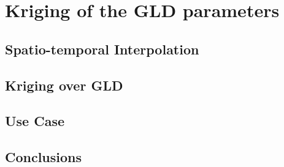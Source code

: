 \chapter{Kriging of the GLD parameters}\label{cap:kriging}

\section{Spatio-temporal Interpolation}

\section{Kriging over GLD}

\section{Use Case}

\section{Conclusions}
